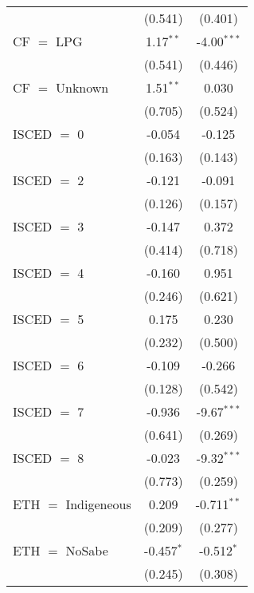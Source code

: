\begin{table}[htbp!]
\begin{adjustbox}{width = 1\textwidth, max height = 0.95\textheight, center}
\begin{threeparttable}[b]
\begin{tabular}{lcc}
                                 & (0.541)        & (0.401)\\   
            CF $=$ LPG           & 1.17$^{**}$    & -4.00$^{***}$\\   
                                 & (0.541)        & (0.446)\\   
            CF $=$ Unknown       & 1.51$^{**}$    & 0.030\\   
                                 & (0.705)        & (0.524)\\   
            ISCED $=$ 0          & -0.054         & -0.125\\   
                                 & (0.163)        & (0.143)\\   
            ISCED $=$ 2          & -0.121         & -0.091\\   
                                 & (0.126)        & (0.157)\\   
            ISCED $=$ 3          & -0.147         & 0.372\\   
                                 & (0.414)        & (0.718)\\   
            ISCED $=$ 4          & -0.160         & 0.951\\   
                                 & (0.246)        & (0.621)\\   
            ISCED $=$ 5          & 0.175          & 0.230\\   
                                 & (0.232)        & (0.500)\\   
            ISCED $=$ 6          & -0.109         & -0.266\\   
                                 & (0.128)        & (0.542)\\   
            ISCED $=$ 7          & -0.936         & -9.67$^{***}$\\   
                                 & (0.641)        & (0.269)\\   
            ISCED $=$ 8          & -0.023         & -9.32$^{***}$\\   
                                 & (0.773)        & (0.259)\\   
            ETH $=$ Indigeneous  & 0.209          & -0.711$^{**}$\\   
                                 & (0.209)        & (0.277)\\   
            ETH $=$ NoSabe       & -0.457$^{*}$   & -0.512$^{*}$\\   
                                 & (0.245)        & (0.308)\\   

\end{tabular}
\end{threeparttable}
\end{adjustbox}
\end{table}
